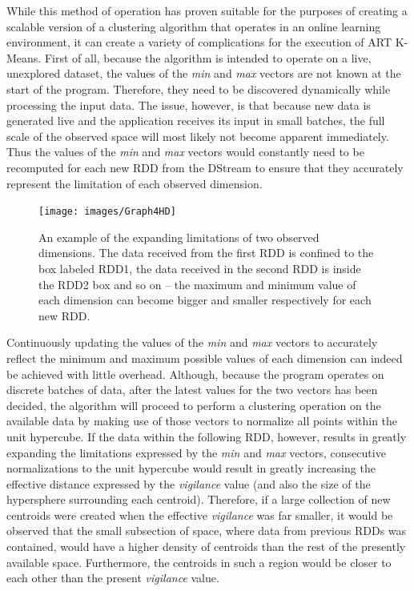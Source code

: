 \documentclass{l4proj}
\begin{document}
While this method of operation has proven suitable for the purposes of creating a scalable version of a clustering algorithm that operates in an online learning environment, it can create a variety of complications for the execution of ART K-Means. First of all, because the algorithm is intended to operate on a live, unexplored dataset, the values of the \textit{min} and \textit{max} vectors are not known at the start of the program. Therefore, they need to be discovered dynamically while processing the input data. The issue, however, is that because new data is generated live and the application receives its input in small batches, the full scale of the observed space will most likely not become apparent immediately. Thus the values of the \textit{min} and \textit{max} vectors would constantly need to be recomputed for each new RDD from the DStream to ensure that they accurately represent the limitation of each observed dimension.\\

\begin{figure}[H]
	\centering
    \label{minMaxgraph}
    \texttt{[image: images/Graph4HD]}
    \caption{An example of the expanding limitations of two observed dimensions. The data received from the first RDD is confined to the box labeled RDD1, the data received in the second RDD is inside the RDD2 box and so on -- the maximum and minimum value of each dimension can become bigger and smaller respectively for each new RDD.} 
\end{figure}

Continuously updating the values of the \textit{min} and \textit{max} vectors to accurately reflect the minimum and maximum possible values of each dimension can indeed be achieved with little overhead. Although, because the program operates on discrete batches of data, after the latest values for the two vectors has been decided, the algorithm will proceed to perform a clustering operation on the available data by making use of those vectors to normalize all points within the unit hypercube. If the data within the following RDD, however, results in greatly expanding the limitations expressed by the \textit{min} and \textit{max} vectors, consecutive normalizations to the unit hypercube would result in greatly increasing the effective distance expressed by the \textit{vigilance} value (and also the size of the hypersphere surrounding each centroid). Therefore, if a large collection of new centroids were created when the effective \textit{vigilance} was far smaller, it would be observed that the small subsection of space, where data from previous RDDs was contained, would have a higher density of centroids than the rest of the presently available space. Furthermore, the centroids in such a region would be closer to each other than the present \textit{vigilance} value.
\end{document}
